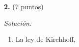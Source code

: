 \textbf{2.} (7 puntos)

\vspace{20px}
\textit{Solución:}
\\

\begin{enumerate}
[label=\alph*)]
    \item La ley de Kirchhoff,
\end{enumerate}

